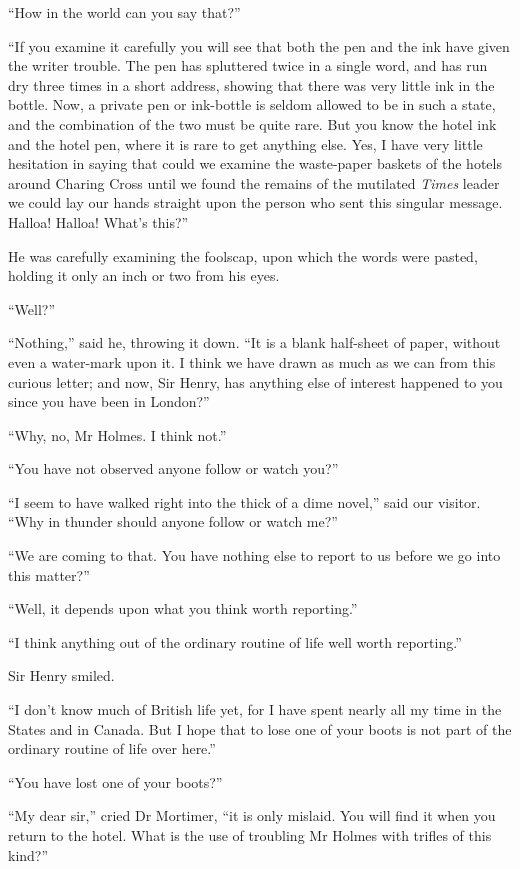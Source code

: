 \documentclass[paper=a5,BCOR=7mm,twoside,DIV=calc,12pt,usegeometry,openany,chapterprefix,endperiod,headings=big]{scrbook} %
\begin{document}
\enquote{How in the world can you say that?}

\enquote{If you examine it carefully you will see that both the pen and the ink have given the writer trouble. The pen has spluttered twice in a single word, and has run dry three times in a short address, showing that there was very little ink in the bottle. Now, a private pen or ink-bottle is seldom allowed to be in such a state, and the combination of the two must be quite rare. But you know the hotel ink and the hotel pen, where it is rare to get anything else. Yes, I have very little hesitation in saying that could we examine the waste-paper baskets of the hotels around Charing Cross until we found the remains of the mutilated \textit{Times} leader we could lay our hands straight upon the person who sent this singular message. Halloa! Halloa! What's this?}

He was carefully examining the foolscap, upon which the words were pasted, holding it only an inch or two from his eyes.

\enquote{Well?}

\enquote{Nothing,} said he, throwing it down. \enquote{It is a blank half-sheet of paper, without even a water-mark upon it. I think we have drawn as much as we can from this curious letter; and now, Sir Henry, has anything else of interest happened to you since you have been in London?}

\enquote{Why, no, Mr Holmes. I think not.}

\enquote{You have not observed anyone follow or watch you?}

\enquote{I seem to have walked right into the thick of a dime novel,} said our visitor. \enquote{Why in thunder should anyone follow or watch me?}

\enquote{We are coming to that. You have nothing else to report to us before we go into this matter?}

\enquote{Well, it depends upon what you think worth reporting.}

\enquote{I think anything out of the ordinary routine of life well worth reporting.}

Sir Henry smiled.

\enquote{I don't know much of British life yet, for I have spent nearly all my time in the States and in Canada. But I hope that to lose one of your boots is not part of the ordinary routine of life over here.}

\enquote{You have lost one of your boots?}

\enquote{My dear sir,} cried Dr Mortimer, \enquote{it is only mislaid. You will find it when you return to the hotel. What is the use of troubling Mr Holmes with trifles of this kind?}
\end{document}
